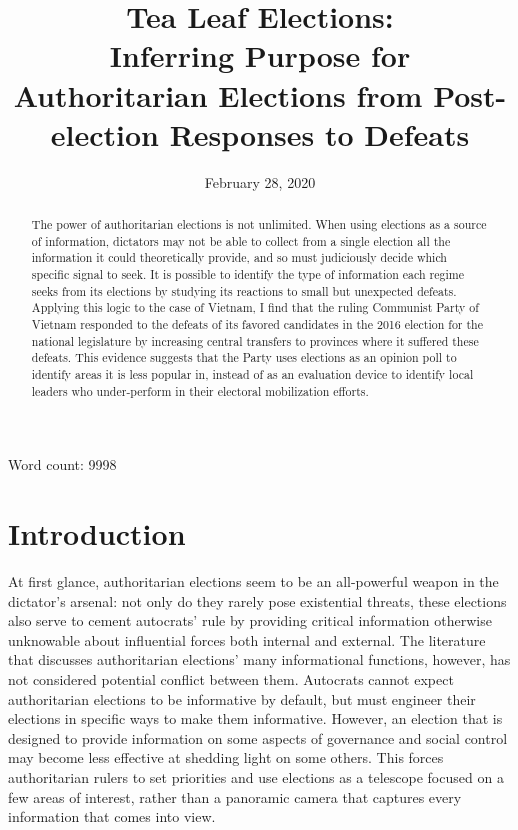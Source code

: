 \documentclass[12pt]{article}
\title{Tea Leaf Elections: \\
	Inferring Purpose for Authoritarian Elections from Post-election Responses to Defeats \\
	\vspace{2ex}
	\vphantom{Online Appendix}}
\date{February 28, 2020}
\newcommand{\1}{\mathbbm{1}}
\begin{document}
	

\maketitle
\thispagestyle{empty}
\doublespacing

\begin{abstract}
The power of authoritarian elections is not unlimited. When using elections as a source of information, dictators may not be able to collect from a single election all the information it could theoretically provide, and so must judiciously decide which specific signal to seek. It is possible to identify the type of information each regime seeks from its elections by studying its reactions to small but unexpected defeats. Applying this logic to the case of Vietnam, I find that the ruling Communist Party of Vietnam responded to the defeats of its favored candidates in the 2016 election for the national legislature by increasing central transfers to provinces where it suffered these defeats. This evidence suggests that the Party uses elections as an opinion poll to identify areas it is less popular in, instead of as an evaluation device to identify local leaders who under-perform in their electoral mobilization efforts.
\end{abstract}

Word count: 9998


\newpage
{}

\section{Introduction}

At first glance, authoritarian elections seem to be an all-powerful weapon in the dictator's arsenal: not only do they rarely pose existential threats, these elections also serve to cement autocrats' rule by providing critical information otherwise unknowable about influential forces both internal and external. The literature that discusses authoritarian elections' many informational functions, however, has not considered potential conflict between them. Autocrats cannot expect authoritarian elections to be informative by default, but must engineer their elections in specific ways to make them informative. However, an election that is designed to provide information on some aspects of governance and social control may become less effective at shedding light on some others. This forces authoritarian rulers to set priorities and use elections as a telescope focused on a few areas of interest, rather than a panoramic camera that captures every information that comes into view.
\end{document}
